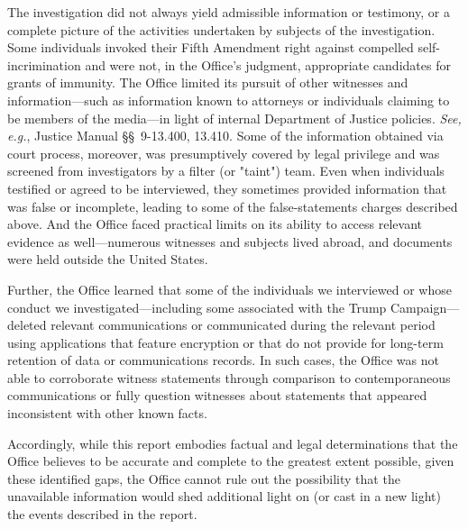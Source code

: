 The investigation did not always yield admissible information or testimony, or a complete picture of the activities undertaken by subjects of the investigation.
Some individuals invoked their Fifth Amendment right against compelled self-incrimination and were not, in the Office's judgment, appropriate candidates for grants of immunity.
The Office limited its pursuit of other witnesses and information---such as information known to attorneys or individuals claiming to be members of the media---in light of internal Department of Justice policies.
\textit{See, e.g.}, Justice Manual \S\S~9-13.400, 13.410. Some of the information obtained via court process, moreover, was presumptively covered by legal privilege and was screened from investigators by a filter (or "taint") team.
Even when individuals testified or agreed to be interviewed, they sometimes provided information that was false or incomplete, leading to some of the false-statements charges described above.
And the Office faced practical limits on its ability to access relevant evidence as well---numerous witnesses and subjects lived abroad, and documents were held outside the United States.

Further, the Office learned that some of the individuals we interviewed or whose conduct we investigated---including some associated with the Trump Campaign---deleted relevant communications or communicated during the relevant period using applications that feature encryption or that do not provide for long-term retention of data or communications records.
In such cases, the Office was not able to corroborate witness statements through comparison to contemporaneous communications or fully question witnesses about statements that appeared inconsistent with other known facts.

Accordingly, while this report embodies factual and legal determinations that the Office believes to be accurate and complete to the greatest extent possible, given these identified gaps, the Office cannot rule out the possibility that the unavailable information would shed additional light on (or cast in a new light) the events described in the report.

